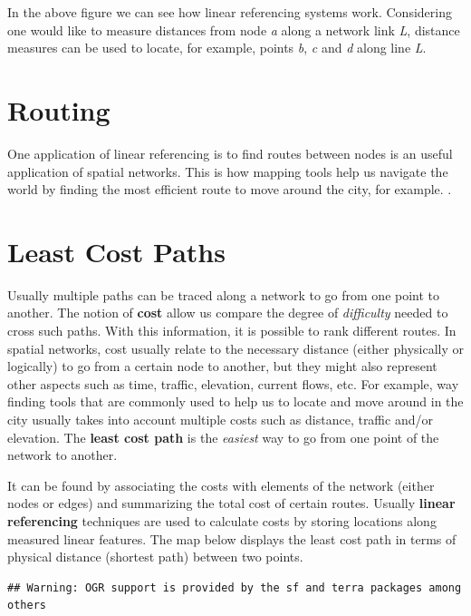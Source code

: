 \documentclass[
]{book}
\begin{document}
In the above figure we can see how linear referencing systems work. Considering one would like to measure distances from node \emph{a} along a network link \emph{L}, distance measures can be used to locate, for example, points \emph{b}, \emph{c} and \emph{d} along line \emph{L}.

\hypertarget{routing}{%
\section{Routing}\label{routing}}

One application of linear referencing is to find routes between nodes is an useful application of spatial networks. This is how mapping tools help us navigate the world by finding the most efficient route to move around the city, for example. \citep{systems_innovation_network_2015}.

\hypertarget{least-cost-paths}{%
\section{Least Cost Paths}\label{least-cost-paths}}

Usually multiple paths can be traced along a network to go from one point to another. The notion of \textbf{cost} allow us compare the degree of \emph{difficulty} needed to cross such paths. With this information, it is possible to rank different routes. In spatial networks, cost usually relate to the necessary distance (either physically or logically) to go from a certain node to another, but they might also represent other aspects such as time, traffic, elevation, current flows, etc. For example, way finding tools that are commonly used to help us to locate and move around in the city usually takes into account multiple costs such as distance, traffic and/or elevation. The \textbf{least cost path} is the \emph{easiest} way to go from one point of the network to another.

It can be found by associating the costs with elements of the network (either nodes or edges) and summarizing the total cost of certain routes. Usually \textbf{linear referencing} techniques are used to calculate costs by storing locations along measured linear features. The map below displays the least cost path in terms of physical distance (shortest path) between two points.

\begin{verbatim}
## Warning: OGR support is provided by the sf and terra packages among others
\end{verbatim}
\end{document}
